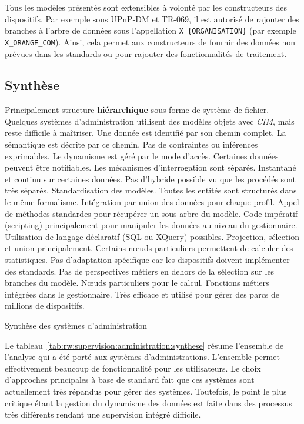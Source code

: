 Tous les modèles présentés sont extensibles à volonté par les constructeurs des dispositifs. Par exemple sous UPnP-DM et TR-069, il est autorisé de rajouter des branches à l'arbre de données sous l'appellation \verb|X_{ORGANISATION}| (par exemple \verb|X_ORANGE_COM|). Ainsi, cela permet aux constructeurs de fournir des données non prévues dans les standards ou pour rajouter des fonctionnalités de traitement.

\subsection{Synthèse}

\begin{table}[!ht]
\criteretabDonnee
    {Principalement structure \textbf{hiérarchique} sous forme de système de fichier. Quelques systèmes d'administration utilisent des modèles objets avec \textit{CIM}, mais reste difficile à maîtriser.}
    {Une donnée est identifié par son chemin complet. La sémantique est décrite par ce chemin. Pas de contraintes ou inférences exprimables.}
    {Le dynamisme est géré par le mode d'accès. Certaines données peuvent être notifiables. Les mécanismes d'interrogation sont séparés.}
\criteretabTraitement
    {Instantané et continu sur certaines données. Pas d'hybride possible vu que les procédés sont très séparés.}
    {Standardisation des modèles. Toutes les entités sont structurés dans le même formalisme. Intégration par union des données pour chaque profil.}
    {Appel de méthodes standardes pour récupérer un sous-arbre du modèle. Code impératif (scripting) principalement pour manipuler les données au niveau du gestionnaire. Utilisation de langage déclaratif (SQL ou XQuery) possibles.}
    {Projection, sélection et union principalement. Certains nœuds particuliers permettent de calculer des statistiques.}
\criteretabAdaptabilite
    {Pas d'adaptation spécifique car les dispositifs doivent implémenter des standards.}
    {Pas de perspectives métiers en dehors de la sélection sur les branches du modèle.}
    {Nœuds particuliers pour le calcul. Fonctions métiers intégrées dans le gestionnaire.}
    {Très efficace et utilisé pour gérer des parcs de millions de dispositifs.}
\caption{Synthèse des systèmes d'administration}\label{tab:rw:supervision:administration:synthese}
\end{table}

Le tableau~\ref{tab:rw:supervision:administration:synthese} résume l'ensemble de l'analyse qui a été porté aux systèmes d'administrations. L'ensemble permet effectivement beaucoup de fonctionnalité pour les utilisateurs. Le choix d'approches principales à base de standard fait que ces systèmes sont actuellement très répandus pour gérer des systèmes. Toutefois, le point le plus critique étant la gestion du dynamisme des données est faite dans des processus très différents rendant une supervision intégré difficile.